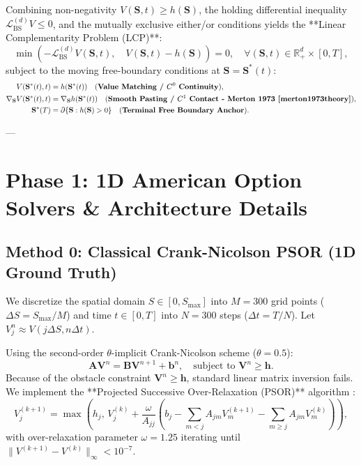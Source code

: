 \documentclass[11pt,a4paper]{article}
\begin{document}
Combining non-negativity $V(\mathbf{S}, t) \ge h(\mathbf{S})$, the holding differential inequality $\mathcal{L}_{\text{BS}}^{(d)} V \le 0$, and the mutually exclusive either/or conditions yields the **Linear Complementarity Problem (LCP)**:
\begin{equation}
\boxed{\min\left( -\mathcal{L}_{\text{BS}}^{(d)} V(\mathbf{S},t), \quad V(\mathbf{S},t) - h(\mathbf{S}) \right) = 0, \quad \forall (\mathbf{S}, t) \in \mathbb{R}_+^d \times [0, T],}
\end{equation}
subject to the moving free-boundary conditions at $\mathbf{S} = \mathbf{S}^*(t)$:
\begin{align}
    V(\mathbf{S}^*(t), t) &= h(\mathbf{S}^*(t)) \quad \text{(\textbf{Value Matching / $C^0$ Continuity})}, \\
    \nabla_\mathbf{S} V(\mathbf{S}^*(t), t) &= \nabla_\mathbf{S} h(\mathbf{S}^*(t)) \quad \text{(\textbf{Smooth Pasting / $C^1$ Contact - Merton 1973 \cite{merton1973theory}})}, \\
    \mathbf{S}^*(T) &= \partial \{ \mathbf{S} : h(\mathbf{S}) > 0 \} \quad \text{(\textbf{Terminal Free Boundary Anchor})}.
\end{align}

---

\section{Phase 1: 1D American Option Solvers \& Architecture Details}

\subsection{Method 0: Classical Crank-Nicolson PSOR (1D Ground Truth)}
We discretize the spatial domain $S \in [0, S_{\max}]$ into $M=300$ grid points ($\Delta S = S_{\max}/M$) and time $t \in [0, T]$ into $N=300$ steps ($\Delta t = T/N$). Let $V_j^n \approx V(j \Delta S, n \Delta t)$.

Using the second-order $\theta$-implicit Crank-Nicolson scheme ($\theta = 0.5$):
\begin{equation}
    \mathbf{A} \mathbf{V}^{n} = \mathbf{B} \mathbf{V}^{n+1} + \mathbf{b}^n, \quad \text{subject to } \mathbf{V}^n \ge \mathbf{h}.
\end{equation}
Because of the obstacle constraint $\mathbf{V}^n \ge \mathbf{h}$, standard linear matrix inversion fails. We implement the **Projected Successive Over-Relaxation (PSOR)** algorithm \cite{cryer1971solution}:
\begin{equation}
    V_j^{(k+1)} = \max \left( h_j, \, V_j^{(k)} + \frac{\omega}{A_{jj}} \left( b_j - \sum_{m < j} A_{jm} V_m^{(k+1)} - \sum_{m \ge j} A_{jm} V_m^{(k)} \right) \right),
\end{equation}
with over-relaxation parameter $\omega = 1.25$ iterating until $\|V^{(k+1)} - V^{(k)}\|_\infty < 10^{-7}$.
\end{document}
